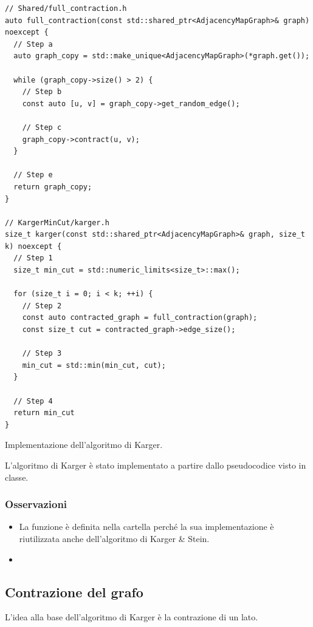 \begin{listing}[!ht]
\begin{verbatim}
// Shared/full_contraction.h
auto full_contraction(const std::shared_ptr<AdjacencyMapGraph>& graph) noexcept {
  // Step a
  auto graph_copy = std::make_unique<AdjacencyMapGraph>(*graph.get());

  while (graph_copy->size() > 2) {
    // Step b
    const auto [u, v] = graph_copy->get_random_edge();

    // Step c
    graph_copy->contract(u, v);
  }

  // Step e
  return graph_copy;
}

// KargerMinCut/karger.h
size_t karger(const std::shared_ptr<AdjacencyMapGraph>& graph, size_t k) noexcept {
  // Step 1
  size_t min_cut = std::numeric_limits<size_t>::max();

  for (size_t i = 0; i < k; ++i) {
    // Step 2
    const auto contracted_graph = full_contraction(graph);
    const size_t cut = contracted_graph->edge_size();

    // Step 3
    min_cut = std::min(min_cut, cut);
  }

  // Step 4
  return min_cut
}
\end{verbatim}
\caption{Implementazione dell'algoritmo di Karger.}
\label{listing:karger}
\end{listing}

\noindent L'algoritmo di Karger è stato implementato a partire dallo pseudocodice visto in classe. \\

\subsubsection{Osservazioni}

\begin{itemize}
    \item La funzione  è definita nella cartella  perché la sua implementazione è riutilizzata anche dell'algoritmo di Karger \& Stein.
    \item
\end{itemize}

\subsection{Contrazione del grafo}
\label{sub:karger-contraction}

L'idea alla base dell'algoritmo di Karger è la contrazione di un lato.

